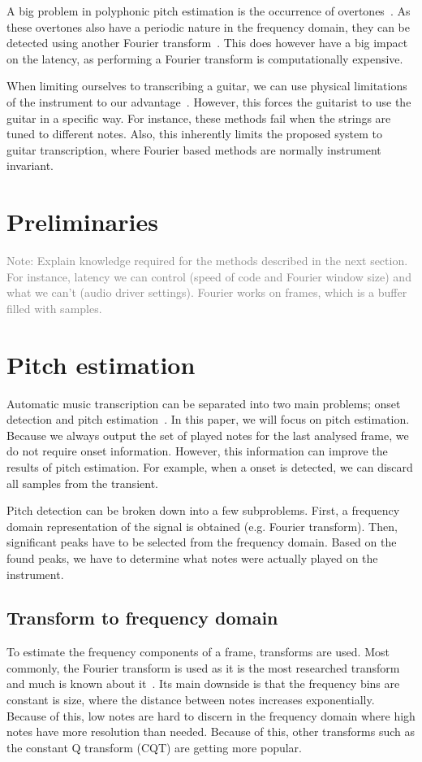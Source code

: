 \documentclass[10pt,twocolumn]{article}
\begin{document}
A big problem in polyphonic pitch estimation is the occurrence of overtones~\cite{oud}. As these overtones also have a periodic nature in the frequency domain, they can be detected using another Fourier transform~\cite{double}. This does however have a big impact on the latency, as performing a Fourier transform is computationally expensive.

When limiting ourselves to transcribing a guitar, we can use physical limitations of the instrument to our advantage~\cite{physical}. However, this forces the guitarist to use the guitar in a specific way. For instance, these methods fail when the strings are tuned to different notes. Also, this inherently limits the proposed system to guitar transcription, where Fourier based methods are normally instrument invariant.


\section{Preliminaries}
\textcolor{gray}{Note: Explain knowledge required for the methods described in the next section. For instance, latency we can control (speed of code and Fourier window size) and what we can't (audio driver settings). Fourier works on frames, which is a buffer filled with samples.}


\section{Pitch estimation}
Automatic music transcription can be separated into two main problems; onset detection and pitch estimation~\cite{survey2}. In this paper, we will focus on pitch estimation. Because we always output the set of played notes for the last analysed frame, we do not require onset information. However, this information can improve the results of pitch estimation. For example, when a onset is detected, we can discard all samples from the transient.

Pitch detection can be broken down into a few subproblems. First, a frequency domain representation of the signal is obtained (e.g. Fourier transform). Then, significant peaks have to be selected from the frequency domain. Based on the found peaks, we have to determine what notes were actually played on the instrument.

\subsection{Transform to frequency domain}
To estimate the frequency components of a frame, transforms are used. Most commonly, the Fourier transform is used as it is the most researched transform and much is known about it~\cite{survey2}. Its main downside is that the frequency bins are constant is size, where the distance between notes increases exponentially. Because of this, low notes are hard to discern in the frequency domain where high notes have more resolution than needed. Because of this, other transforms such as the constant Q transform (CQT) are getting more popular.
\end{document}

